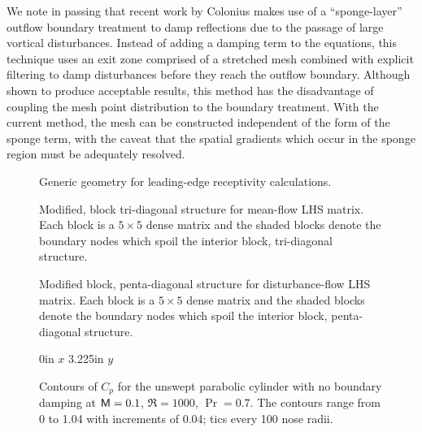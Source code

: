 We note in passing that recent work by Colonius \etal \cite{CoMoLe:95} makes
use of a ``sponge-layer'' outflow boundary treatment to damp reflections due
to the passage of large vortical disturbances.  Instead of adding a damping
term to the equations, this technique uses an exit zone comprised of a
stretched mesh combined with explicit filtering to damp disturbances before
they reach the outflow boundary.  Although shown to produce acceptable
results, this method has the disadvantage of coupling the mesh point
distribution to the boundary treatment.  With the current method, the mesh can
be constructed independent of the form of the sponge term, with the caveat that
the spatial gradients which occur in the sponge region must be adequately
resolved.
%
%

%
%
%
%
\begin{figure}[p]
\centering \epsfxsize=5.0in 
\caption {Generic geometry for leading-edge receptivity
calculations. \label{f:domain}}
\end{figure}
%
%
\begin{figure}[p]
\centering
\epsfxsize=4.0in 
\caption[Modified, block tri-diagonal matrix structure.] {Modified, block
tri-diagonal structure for mean-flow LHS matrix.  Each block is a $5 \times 5$
dense matrix and the shaded blocks denote the boundary nodes which spoil the
interior block, tri-diagonal structure. \label{f:tri}}
\end{figure}
%
\begin{figure}[p]
\centering
\epsfxsize=4.0in 
\caption[Modified block, penta-diagonal matrix structure] {Modified block,
penta-diagonal structure for disturbance-flow LHS matrix. Each block is a $5
\times 5$ dense matrix and the shaded blocks denote the boundary nodes which
spoil the interior block, penta-diagonal structure. \label{f:penta}}
\end{figure}
%
%
\begin{figure}[p]
\centering
\figlab 3.3in 0in {$x$}
\figlab -0.1in 3.225in {$y$}
\epsfxsize=3.25in 
\caption[Contours of the pressure coefficient for the unswept parabolic
cylinder with no boundary damping] {Contours of $C_p$ for the unswept
parabolic cylinder with no boundary damping at ${\sf M}=0.1$, $\Re=1000$,
$\Pr=0.7$.  The contours range from 0 to 1.04 with increments of 0.04; tics
every 100 nose radii. \label{f:M=0.1p3}}
\end{figure}
